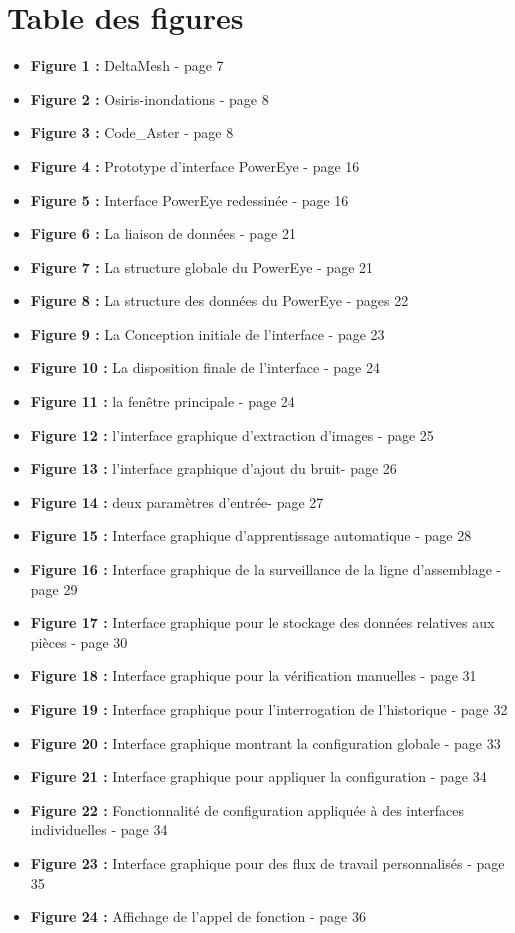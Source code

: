 \chapter*{Table des figures} %

\begin{itemize}
\item \textbf{Figure 1 :} DeltaMesh - page 7
\item \textbf{Figure 2 :}  Osiris-inondations - page 8
\item \textbf{Figure 3 :}  Code\_Aster - page 8
\item \textbf{Figure 4 :} Prototype d’interface PowerEye - page 16
\item \textbf{Figure 5 :} Interface PowerEye redessinée - page 16
\item \textbf{Figure 6 :}  La liaison de données - page 21
\item \textbf{Figure 7 :} La structure globale du PowerEye - page 21
\item \textbf{Figure 8 :} La structure des données du PowerEye - pages 22
\item \textbf{Figure 9 :} La Conception initiale de l’interface - page 23
\item \textbf{Figure 10 :} La disposition finale de l’interface - page 24
\item \textbf{Figure 11 :} la fenêtre principale - page 24
\item \textbf{Figure 12 :} l’interface graphique d’extraction d’images - page 25
\item \textbf{Figure 13 :} l’interface graphique d’ajout du bruit- page 26
\item \textbf{Figure 14 :} deux paramètres d’entrée- page 27
\item \textbf{Figure 15 :} Interface graphique d’apprentissage automatique - page 28
\item \textbf{Figure 16 :} Interface graphique de la surveillance de la ligne d’assemblage - page 29
\item \textbf{Figure 17 :}  Interface graphique pour le stockage des données relatives aux pièces - page 30
\item \textbf{Figure 18 :} Interface graphique pour la vérification manuelles - page 31
\item \textbf{Figure 19 :} Interface graphique pour l’interrogation de l’historique - page 32
\item \textbf{Figure 20 :} Interface graphique montrant la configuration globale - page 33
\item \textbf{Figure 21 :} Interface graphique pour appliquer la configuration - page 34
\item \textbf{Figure 22 :} Fonctionnalité de configuration appliquée à des interfaces individuelles - page 34
\item \textbf{Figure 23 :} Interface graphique pour des flux de travail personnalisés - page 35
\item \textbf{Figure 24 :}  Affichage de l’appel de fonction - page 36
\end{itemize}